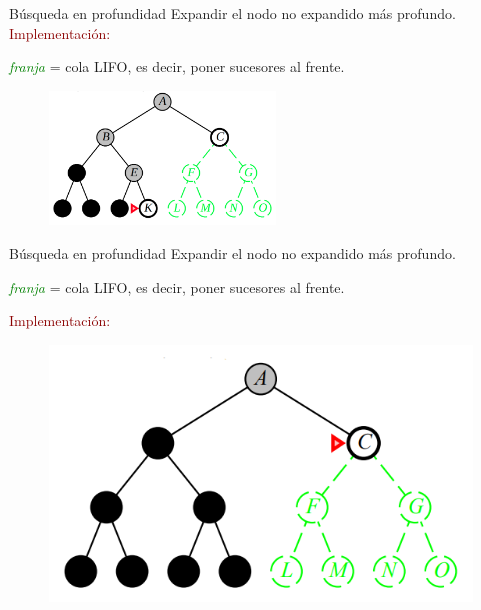 \documentclass{beamer}
\theoremstyle{definition}
\theoremstyle{theorem}
\theoremstyle{remark}
\begin{document}

\begin{frame}{Búsqueda en profundidad}
Expandir el nodo no expandido más profundo.\\
\textcolor{DarkRed}{Implementación:}
\begin{center}
    \textit{\textcolor{Green}{franja}} = cola LIFO, es decir, poner sucesores al
    frente.\\
\end{center}
\begin{figure}
    \centering
    \includegraphics[width = 60mm, scale = 0.7]{50_chap3_pag50.PNG}
\end{figure}
\end{frame}


\begin{frame}{Búsqueda en profundidad}
Expandir el nodo no expandido más profundo.\\
\begin{center}
    \textit{\textcolor{Green}{franja}} = cola LIFO, es decir, poner sucesores al
    frente.\\
\end{center}{}

\textcolor{DarkRed}{Implementación:}
    \begin{figure}
        \includegraphics[scale=0.2]{51_chap3_pag51.png}
    \end{figure}
\end{frame}{}
\end{document}
